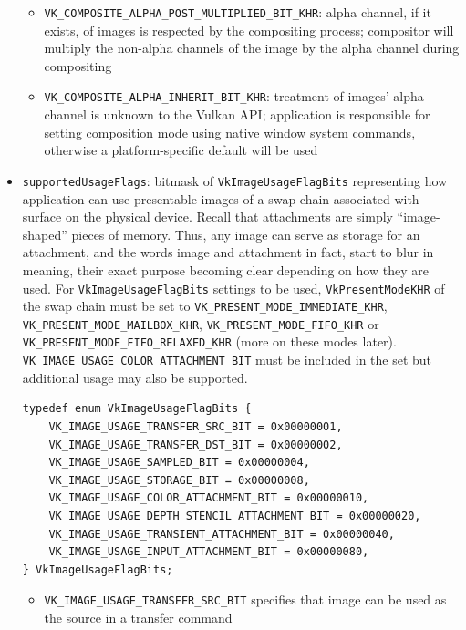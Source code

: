 \documentclass[12pt,letterpaper]{article}
\newcommand{\inquotes}[1]{``#1''}	%
\newcommand{\cil}[1]{\texttt{#1}}
\begin{document}
\begin{itemize}
\begin{itemize}
        \item \cil{VK_COMPOSITE_ALPHA_POST_MULTIPLIED_BIT_KHR}: alpha channel, if it exists, of images is respected by the compositing process; compositor will multiply the non-alpha channels of the image by the alpha channel during compositing
        
        \item \cil{VK_COMPOSITE_ALPHA_INHERIT_BIT_KHR}: treatment of images' alpha channel is unknown to the Vulkan API; application is responsible for setting composition mode using native window system commands, otherwise a platform-specific default will be used
    \end{itemize}
        
        \item \cil{supportedUsageFlags}: bitmask of \cil{VkImageUsageFlagBits} representing how application can use presentable images of a swap chain associated with surface on the physical device. Recall that attachments are simply \inquotes{image-shaped} pieces of memory. Thus, any image can serve as storage for an attachment, and the words image and attachment in fact, start to blur in meaning, their exact purpose becoming clear depending on how they are used. For \cil{VkImageUsageFlagBits} settings to be used, \cil{VkPresentModeKHR} of the swap chain must be set to \cil{VK_PRESENT_MODE_IMMEDIATE_KHR}, \cil{VK_PRESENT_MODE_MAILBOX_KHR}, \cil{VK_PRESENT_MODE_FIFO_KHR} or \cil{VK_PRESENT_MODE_FIFO_RELAXED_KHR} (more on these modes later). \cil{VK_IMAGE_USAGE_COLOR_ATTACHMENT_BIT} must be included in the set but additional usage may also be supported. 
        
        \begin{verbatim}
typedef enum VkImageUsageFlagBits {
    VK_IMAGE_USAGE_TRANSFER_SRC_BIT = 0x00000001,
    VK_IMAGE_USAGE_TRANSFER_DST_BIT = 0x00000002,
    VK_IMAGE_USAGE_SAMPLED_BIT = 0x00000004,
    VK_IMAGE_USAGE_STORAGE_BIT = 0x00000008,
    VK_IMAGE_USAGE_COLOR_ATTACHMENT_BIT = 0x00000010,
    VK_IMAGE_USAGE_DEPTH_STENCIL_ATTACHMENT_BIT = 0x00000020,
    VK_IMAGE_USAGE_TRANSIENT_ATTACHMENT_BIT = 0x00000040,
    VK_IMAGE_USAGE_INPUT_ATTACHMENT_BIT = 0x00000080,
} VkImageUsageFlagBits;
        \end{verbatim}
            \begin{itemize}
                \item \cil{VK_IMAGE_USAGE_TRANSFER_SRC_BIT} specifies that image can be used as the source in a transfer command
                

\end{itemize}
\end{itemize}
\end{document}
